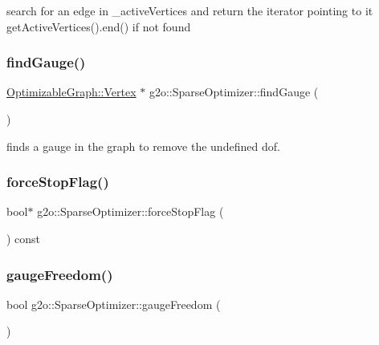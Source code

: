 search for an edge in \+\_\+active\+Vertices and return the iterator pointing to it get\+Active\+Vertices().end() if not found \mbox{\label{classg2o_1_1_sparse_optimizer_aad77b73bf7d192fcebf1daf9ae103036}} 
\subsubsection{\texorpdfstring{find\+Gauge()}{findGauge()}}
{\footnotesize\ttfamily \mbox{\hyperlink{classg2o_1_1_optimizable_graph_1_1_vertex}{Optimizable\+Graph\+::\+Vertex}} $\ast$ g2o\+::\+Sparse\+Optimizer\+::find\+Gauge (\begin{DoxyParamCaption}{ }\end{DoxyParamCaption})\hspace{0.3cm}{\ttfamily [virtual]}}



finds a gauge in the graph to remove the undefined dof. 

\mbox{\label{classg2o_1_1_sparse_optimizer_aa3e5ee5263cd424aa763330d3a8a77c8}} 
\subsubsection{\texorpdfstring{force\+Stop\+Flag()}{forceStopFlag()}}
{\footnotesize\ttfamily bool$\ast$ g2o\+::\+Sparse\+Optimizer\+::force\+Stop\+Flag (\begin{DoxyParamCaption}{ }\end{DoxyParamCaption}) const\hspace{0.3cm}{\ttfamily [inline]}}

\mbox{\label{classg2o_1_1_sparse_optimizer_ac99e785f4822dd540b389ea179ce4f06}} 
\subsubsection{\texorpdfstring{gauge\+Freedom()}{gaugeFreedom()}}
{\footnotesize\ttfamily bool g2o\+::\+Sparse\+Optimizer\+::gauge\+Freedom (\begin{DoxyParamCaption}{ }\end{DoxyParamCaption})}

